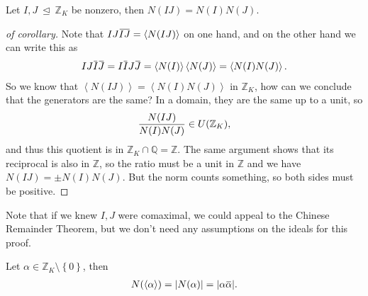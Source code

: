 \begin{corollary}

Let \(I, J {~\trianglelefteq~}{\mathbb{Z}}_K\) be nonzero, then
\(N(IJ) = N(I) N(J)\).

\end{corollary}

\begin{proof}[of corollary]

Note that
\(IJ \mkern 1.5mu\overline{\mkern-1.5muIJ\mkern-1.5mu}\mkern 1.5mu = \left\langle{ N(IJ) }\right\rangle\)
on one hand, and on the other hand we can write this as
\begin{align*}
IJ \mkern 1.5mu\overline{\mkern-1.5muI\mkern-1.5mu}\mkern 1.5mu \mkern 1.5mu\overline{\mkern-1.5muJ\mkern-1.5mu}\mkern 1.5mu = I\mkern 1.5mu\overline{\mkern-1.5muI\mkern-1.5mu}\mkern 1.5mu J \mkern 1.5mu\overline{\mkern-1.5muJ\mkern-1.5mu}\mkern 1.5mu = \left\langle{ N(I) }\right\rangle \left\langle{ N(J) }\right\rangle = \left\langle{ N(I) N(J) }\right\rangle
.\end{align*}
So we know that
\(\left\langle{ N(IJ) }\right\rangle = \left\langle{ N(I) N(J) }\right\rangle\)
in \({\mathbb{Z}}_K\), how can we conclude that the generators are the
same? In a domain, they are the same up to a unit, so
\begin{align*}
{ N(IJ) \over N(I) N(J) } \in U({\mathbb{Z}}_K)
,\end{align*}
and thus this quotient is in
\({\mathbb{Z}}_K \cap{\mathbb{Q}}= {\mathbb{Z}}\). The same argument
shows that its reciprocal is also in \({\mathbb{Z}}\), so the ratio must
be a unit in \({\mathbb{Z}}\) and we have \(N(IJ) = \pm N(I) N(J)\). But
the norm counts something, so both sides must be positive.

\end{proof}

\begin{remark}

Note that if we knew \(I, J\) were comaximal, we could appeal to the
Chinese Remainder Theorem, but we don't need any assumptions on the
ideals for this proof.

\end{remark}

\begin{corollary}

Let \(\alpha\in {\mathbb{Z}}_K \setminus\left\{{0}\right\}\), then
\begin{align*}
N( \left\langle{ \alpha }\right\rangle ) = {\left\lvert {N(\alpha)} \right\rvert}  = {\left\lvert {\alpha\mkern 1.5mu\overline{\mkern-1.5mu\alpha\mkern-1.5mu}\mkern 1.5mu} \right\rvert} 
.\end{align*}

\end{corollary}

